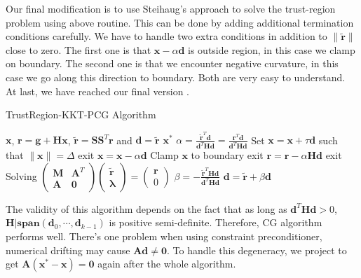 \documentclass[annual]{acmsiggraph}
\newcommand{\E}[1]{\mathbf{#1}}
\newcommand{\TWOC}[2]{\left(\begin{array}{c}#1 \\ #2\end{array}\right)}
\newcommand{\MTT}[4]{\left(\begin{array}{cc}#1 & #2 \\ #3 & #4\end{array}\right)}
\begin{document}
Our final modification is to use Steihaug's approach \cite{steihaug1983conjugate} to solve the trust-region problem using above routine. This can be done by adding additional termination conditions carefully. We have to handle two extra conditions in addition to $\|\tilde{\E{r}}\|$ close to zero. The first one is that $\E{x}-\alpha\E{d}$ is outside region, in this case we clamp on boundary. The second one is that we encounter negative curvature, in this case we go along this direction to boundary. Both are very easy to understand. At last, we have reached our final version .
\begin{algorithm}[h]
\caption{TrustRegion-KKT-PCG Algorithm}
\label{alg:TRKKTPCG}
\begin{algorithmic}
\REQUIRE $\E{x}$, $\E{r}=\E{g}+\E{H}\E{x}$, $\tilde{\E{r}}=\E{S}\E{S}^T\E{r}$ and $\E{d}=\tilde{\E{r}}$
\ENSURE $\E{x}^*$
\STATE $\alpha=\frac{\tilde{\E{r}}^T\E{d}}{\E{d}^T\E{H}\E{d}}=\frac{\E{r}^T\E{d}}{\E{d}^T\E{H}\E{d}}$
\IF {$\E{d}^T\E{H}\E{d}\leq0$}
\STATE Set $\E{x}=\E{x}+\tau\E{d}$ such that $\|\E{x}\|=\Delta$
\STATE exit
\ENDIF
\STATE $\E{x}=\E{x}-\alpha\E{d}$
\IF{$\|\E{x}\|>\Delta$}
\STATE Clamp $\E{x}$ to boundary
\STATE exit
\ENDIF
\STATE $\E{r}=\E{r}-\alpha\E{H}\E{d}$
\IF{$\|\E{r}\|$ small enough}
\STATE exit
\ENDIF
\STATE Solving $\MTT{\E{M}}{\E{A}^T}{\E{A}}{\E{0}}\TWOC{\tilde{\E{r}}}{\E{\lambda}}=\TWOC{\E{r}}{0}$
\STATE $\beta=-\frac{\tilde{\E{r}}^T\E{H}\E{d}}{\E{d}^T\E{H}\E{d}}$
\STATE $\E{d}=\tilde{\E{r}}+\beta\E{d}$
\ENDWHILE
\end{algorithmic}
\end{algorithm}
The validity of this algorithm depends on the fact that as long as $\E{d}^T\E{H}\E{d}>0$, $\E{H}|\E{span}(\E{d}_0,\cdots,\E{d}_{k-1})$ is positive semi-definite. Therefore, CG algorithm performs well. There's one problem when using constraint preconditioner, numerical drifting may cause $\E{A}\E{d}\neq\E{0}$. To handle this degeneracy, we project to get $\E{A}(\E{x}^*-\E{x})=\E{0}$ again after the whole algorithm.
\end{document}
